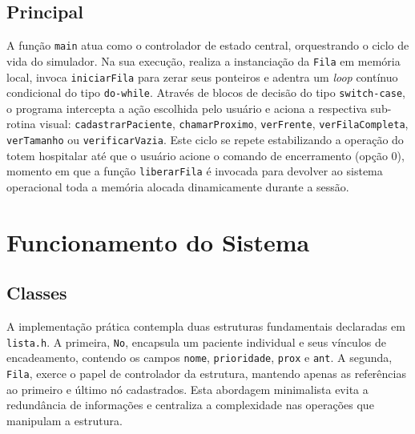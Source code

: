 \documentclass[12pt,a4paper]{article}
\begin{document}
\subsection{Principal}
A função \texttt{main} atua como o controlador de estado central, orquestrando o ciclo de vida do simulador. Na sua execução, realiza a instanciação da \texttt{Fila} em memória local, invoca \texttt{iniciarFila} para zerar seus ponteiros e adentra um \textit{loop} contínuo condicional do tipo \texttt{do-while}. Através de blocos de decisão do tipo \texttt{switch-case}, o programa intercepta a ação escolhida pelo usuário e aciona a respectiva sub-rotina visual: \texttt{cadastrarPaciente}, \texttt{chamarProximo}, \texttt{verFrente}, \texttt{verFilaCompleta}, \texttt{verTamanho} ou \texttt{verificarVazia}. Este ciclo se repete estabilizando a operação do totem hospitalar até que o usuário acione o comando de encerramento (opção 0), momento em que a função \texttt{liberarFila} é invocada para devolver ao sistema operacional toda a memória alocada dinamicamente durante a sessão.


\section{Funcionamento do Sistema}
\label{sec:funcionamento_sistema}

\subsection{Classes}
A implementação prática contempla duas estruturas fundamentais declaradas em \texttt{lista.h}. A primeira, \texttt{No}, encapsula um paciente individual e seus vínculos de encadeamento, contendo os campos \texttt{nome}, \texttt{prioridade}, \texttt{prox} e \texttt{ant}. A segunda, \texttt{Fila}, exerce o papel de controlador da estrutura, mantendo apenas as referências ao primeiro e último nó cadastrados. Esta abordagem minimalista evita a redundância de informações e centraliza a complexidade nas operações que manipulam a estrutura.
\end{document}
